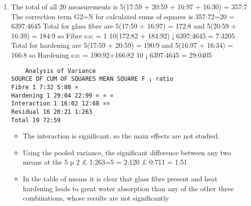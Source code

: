 \documentclass[a4paper,12pt]{article}
\begin{document}
\begin{enumerate}
    \item The total of all 20 measurements is 5(17:59 + 20:59 + 16:97 + 16:30) = 357:7 The correction
term G2=N for calculated sums of squares is 357:72=20 = 6397:4645 Total for glass fibre are
5(17:59 + 16:97) = 172:8 and 5(20:59 + 16:39) = 184:9 so Fibre s:s: = 1
10(172:82 + 184:92) ¡
6397:4645 = 7:3205 Total for hardening are 5(17:59 + 20:59) = 190:9 and 5(16:97 + 16:34) =
166:8 so Hardening s:s: = 190:92+166:82
10 ¡ 6397:4645 = 29:0405
\begin{verbatim}
    Analysis of Variance
SOURCE DF CUM OF SQUARES MEAN SQUARE F ¡ ratio
Fibre 1 7:32 5:80 ¤
Hardening 1 29:04 22:99 ¤ ¤ ¤
Interaction 1 16:02 12:68 ¤¤
Residual 16 20:21 1:263
Total 19 72:59
\end{verbatim}

\begin{itemize}
    \item The interaction is significant, so the main effects are not studied. 
    \item Using the pooled variance,
the significant difference between any two means at the 5%
p
2 £ 1:263=5 =
2:120 £ 0:711 = 1:51
\item In the table of means it is clear that glass fibre present and heat hardening leads to great
water absorption than any of the other three combinations, whose results are not significantly
\end{itemize}


\end{enumerate}
\end{document}
